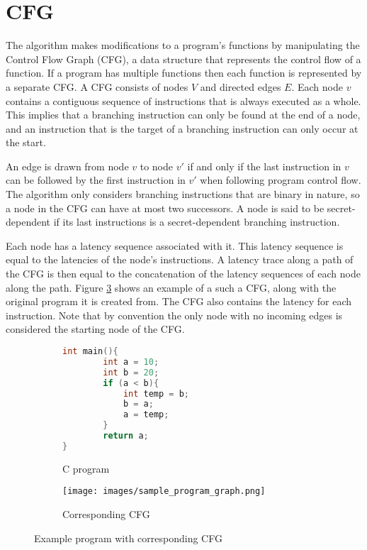 \section{CFG}\label{sec:cfg}

The algorithm makes modifications to a program's functions by manipulating the Control Flow Graph (CFG), a data structure that represents the control flow of a function.
If a program has multiple functions then each function is represented by a separate CFG. 
A CFG consists of nodes $V$ and directed edges $E$. Each node $v$ contains a 
contiguous sequence of instructions that is always executed as a whole. This implies that a branching instruction can only be found at the end of a node, 
and an instruction that is the target of a branching instruction can only occur at the start.

An edge is drawn from node $v$ to node $v'$ if and only if the last instruction in $v$ can be followed by the first instruction in $v'$ 
when following program control flow. The algorithm only considers branching instructions that are binary in nature, so a node in the CFG can have at most two successors. 
A node is said to be secret-dependent if its last instructions is a 
secret-dependent branching instruction. 

Each node has a latency sequence associated with it. This latency sequence is equal to the latencies of the node's instructions.  
A latency trace along a path of the CFG is then equal to the concatenation of the latency sequences of each node along the path.
Figure \ref{fig:exampleCFG} shows an example of a such a CFG, along with the original program it is created from. The CFG also contains the latency for each instruction. Note that by convention the only node with no incoming edges is considered the starting node of the CFG. 

\begin{figure}
\centering
\begin{subfigure}{.4\textwidth}
  \centering
  
    \begin{lstlisting}[language=C]
int main(){
        int a = 10; 
        int b = 20; 
        if (a < b){
            int temp = b; 
            b = a; 
            a = temp; 
        } 
        return a;  
}\end{lstlisting}
  \caption{C program}
  \label{fig:c_program}
\end{subfigure}%
\begin{subfigure}{.7\textwidth}
  \centering
  \texttt{[image: images/sample\_program\_graph.png]}
  \caption{Corresponding CFG}
  \label{fig:c_program_cfg}
\end{subfigure}
\caption{Example program with corresponding CFG}
\label{fig:exampleCFG}
\end{figure}

